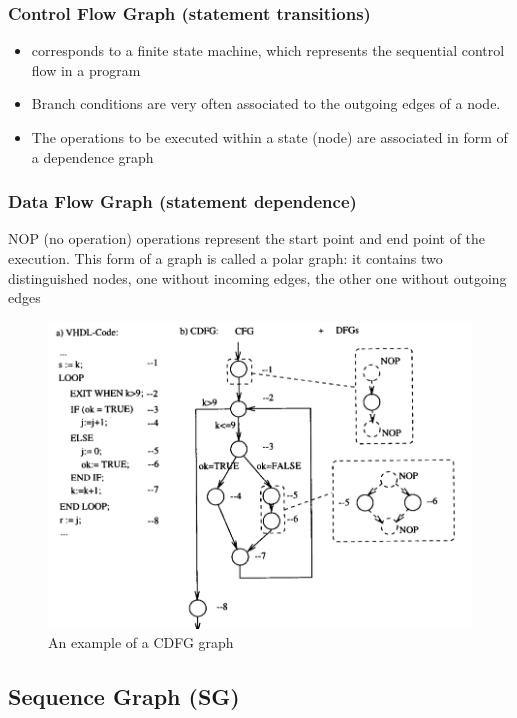 \subsubsection{Control Flow Graph (statement transitions)}
\begin{itemize}[noitemsep]
\item corresponds to a finite state machine, which represents the sequential control flow in a program
\item Branch conditions are very often associated to the outgoing edges of a node. 
\item The operations to be executed within a state (node) are associated in form of a dependence graph
\end{itemize}

\subsubsection{Data Flow Graph (statement dependence)}
NOP (no operation) operations represent the start point and 
end point of the execution. This form of a graph is called a 
polar graph: it contains two distinguished nodes, one without incoming edges, the other one without outgoing edges

\begin{figure}[ht]
	\centering
  	\includegraphics[scale=0.4]{img/10_CDFG.png}
	\caption{An example of a CDFG graph}
	\label{fig_CDFG_graph}
\end{figure}

\subsection{Sequence Graph (SG)}

